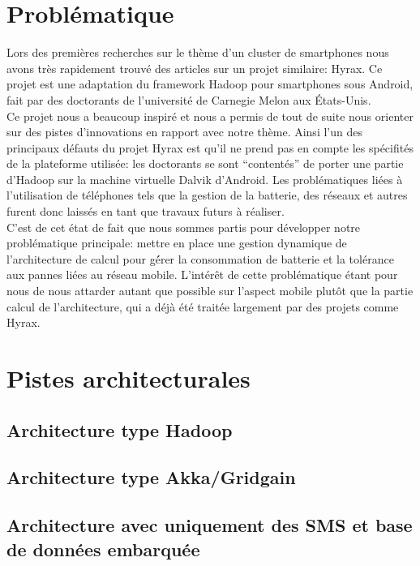\documentclass[a4paper,12pt]{article}
\begin{document}
\fancyhead[L]{\leftmark}

\section{Problématique}
Lors des premières recherches sur le thème d’un cluster de smartphones nous
avons très rapidement trouvé des articles sur un projet similaire: Hyrax. Ce
projet est une adaptation du framework Hadoop pour smartphones sous Android,
fait par des doctorants de l’université de Carnegie Melon aux États-Unis.\\
Ce projet nous a beaucoup inspiré et nous a permis de tout de suite nous
orienter sur des pistes d’innovations en rapport avec notre thème. Ainsi l’un
des principaux défauts du projet Hyrax est qu’il ne prend pas en compte les
spécifités de la plateforme utilisée: les doctorants se sont “contentés” de
porter une partie d’Hadoop sur la machine virtuelle Dalvik d’Android. Les
problématiques liées à l’utilisation de téléphones tels que la gestion de la
batterie, des réseaux et autres furent donc laissés en tant que travaux futurs
à réaliser.\\
C’est de cet état de fait que nous sommes partis pour développer notre
problématique principale: mettre en place une gestion dynamique de
l’architecture de calcul pour gé́rer la consommation de batterie et la
tolérance aux pannes liées au réseau mobile. L’intérêt de cette problématique
étant pour nous de nous attarder autant que possible sur l’aspect mobile
plutôt que la partie calcul de l’architecture, qui a déjà été traitée
largement par des projets comme Hyrax.\\

\section{Pistes architecturales}
\subsection{Architecture type Hadoop}

\subsection{Architecture type Akka/Gridgain}
\subsection{Architecture avec uniquement des SMS et base de données embarquée}
\end{document}
